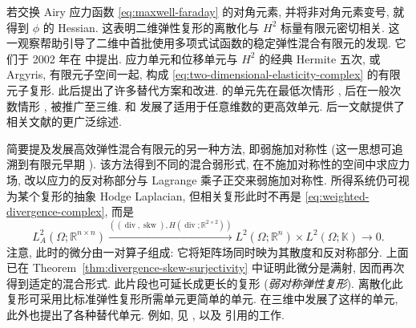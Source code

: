 若交换 Airy 应力函数 \eqref{eq:maxwell-faraday} 的对角元素, 并将非对角元素变号, 就得到 $\phi$ 的 Hessian. 这表明二维弹性复形的离散化与 $H^2$ 标量有限元密切相关. 这一观察帮助引导了二维中首批使用多项式试函数的稳定弹性混合有限元的发现. 它们于 2002 年在  中提出. 应力单元和位移单元与 $H^2$ 的经典 Hermite 五次, 或 Argyris, 有限元子空间一起, 构成 \eqref{eq:two-dimensional-elasticity-complex} 的有限元子复形. 此后提出了许多替代方案和改进.  的单元先在最低次情形 , 后在一般次数情形 , 被推广至三维.  和  发展了适用于任意维数的更高效单元. 后一文献提供了相关文献的更广泛综述.

简要提及发展高效弹性混合有限元的另一种方法, 即弱施加对称性 (这一思想可追溯到有限元早期 ). 该方法得到不同的混合弱形式, 在不施加对称性的空间中求应力场, 改以应力的反对称部分与 Lagrange 乘子正交来弱施加对称性. 所得系统仍可视为某个复形的抽象 Hodge Laplacian, 但相关复形此时不再是 \eqref{eq:weighted-divergence-complex}, 而是
\[
L_A^2(\Omega;\mathbb R^{n\times n})\xrightarrow{((\operatorname{div},\operatorname{skw}),H(\operatorname{div};\mathbb R^{2\times2}))}L^2(\Omega;\mathbb R^n)\times L^2(\Omega;\mathbb K)\to0.
\]
注意, 此时的微分由一对算子组成: 它将矩阵场同时映为其散度和反对称部分. 上面已在 Theorem~\ref{thm:divergence-skew-surjectivity} 中证明此微分是满射, 因而再次得到适定的混合形式. 此片段也可延长成更长的复形 (\emph{弱对称弹性复形}). 离散化此复形可采用比标准弹性复形所需单元更简单的单元.  在三维中发展了这样的单元, 此外也提出了各种替代单元. 例如, 见 ,  以及  引用的工作.
